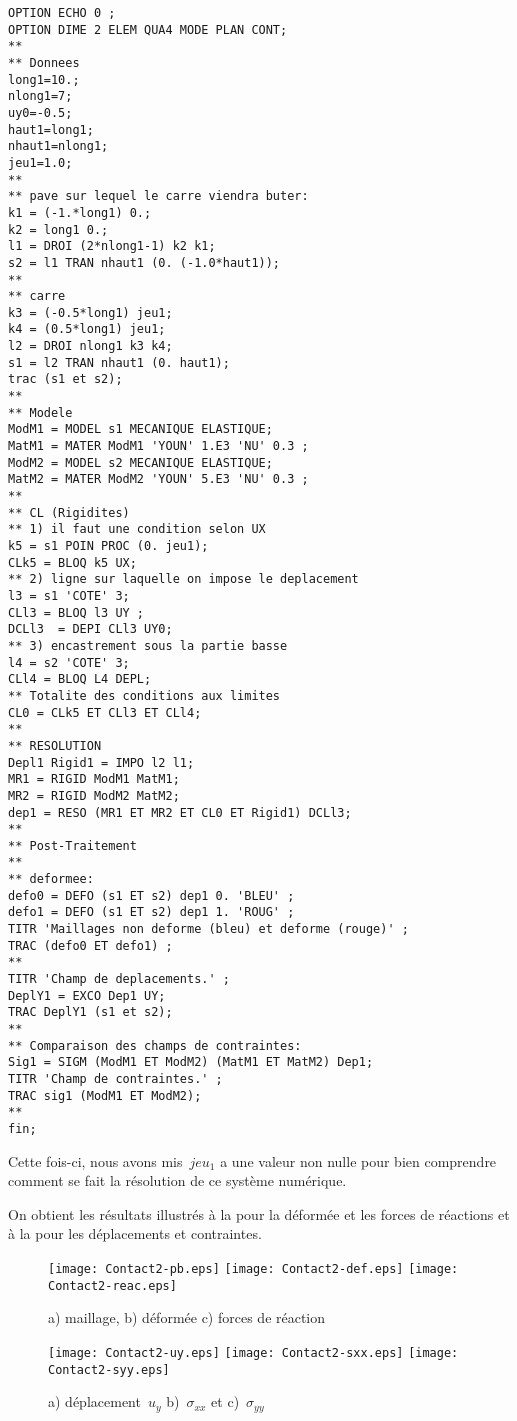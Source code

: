 \begin{multicols}{2}
\begin{lstlisting}[firstnumber=1]
OPTION ECHO 0 ;
OPTION DIME 2 ELEM QUA4 MODE PLAN CONT;
**
** Donnees
long1=10.;
nlong1=7;
uy0=-0.5;
haut1=long1;
nhaut1=nlong1;
jeu1=1.0;
**
** pave sur lequel le carre viendra buter:
k1 = (-1.*long1) 0.;
k2 = long1 0.;
l1 = DROI (2*nlong1-1) k2 k1;
s2 = l1 TRAN nhaut1 (0. (-1.0*haut1));
**
** carre
k3 = (-0.5*long1) jeu1;
k4 = (0.5*long1) jeu1;
l2 = DROI nlong1 k3 k4;
s1 = l2 TRAN nhaut1 (0. haut1);
trac (s1 et s2);
**
** Modele
ModM1 = MODEL s1 MECANIQUE ELASTIQUE;
MatM1 = MATER ModM1 'YOUN' 1.E3 'NU' 0.3 ;
ModM2 = MODEL s2 MECANIQUE ELASTIQUE;
MatM2 = MATER ModM2 'YOUN' 5.E3 'NU' 0.3 ;
**
** CL (Rigidites)
** 1) il faut une condition selon UX
k5 = s1 POIN PROC (0. jeu1);
CLk5 = BLOQ k5 UX;
** 2) ligne sur laquelle on impose le deplacement
l3 = s1 'COTE' 3;
CLl3 = BLOQ l3 UY ;
DCLl3  = DEPI CLl3 UY0;
** 3) encastrement sous la partie basse
l4 = s2 'COTE' 3;
CLl4 = BLOQ L4 DEPL;
** Totalite des conditions aux limites
CL0 = CLk5 ET CLl3 ET CLl4;
**
** RESOLUTION
Depl1 Rigid1 = IMPO l2 l1;
MR1 = RIGID ModM1 MatM1;
MR2 = RIGID ModM2 MatM2;
dep1 = RESO (MR1 ET MR2 ET CL0 ET Rigid1) DCLl3;
**
** Post-Traitement
**
** deformee:
defo0 = DEFO (s1 ET s2) dep1 0. 'BLEU' ;
defo1 = DEFO (s1 ET s2) dep1 1. 'ROUG' ;
TITR 'Maillages non deforme (bleu) et deforme (rouge)' ;
TRAC (defo0 ET defo1) ;
**
TITR 'Champ de deplacements.' ;
DeplY1 = EXCO Dep1 UY;
TRAC DeplY1 (s1 et s2);
**
** Comparaison des champs de contraintes:
Sig1 = SIGM (ModM1 ET ModM2) (MatM1 ET MatM2) Dep1;
TITR 'Champ de contraintes.' ;
TRAC sig1 (ModM1 ET ModM2);
**
fin;
\end{lstlisting}
\end{multicols}

Cette fois-ci, nous avons mis~$jeu_1$ a une valeur non nulle pour bien comprendre comment se fait la résolution de ce système numérique.

On obtient les résultats illustrés à la  pour la déformée et les forces de réactions et à la  pour les déplacements et contraintes.
\begin{figure}[ht]
  \texttt{[image: Contact2-pb.eps]} \hfill 
  \texttt{[image: Contact2-def.eps]}\hfill 
  \texttt{[image: Contact2-reac.eps]}
  \caption{\label{Fig-Cont21} a) maillage, b) déformée c) forces de réaction}
\end{figure}

\begin{figure}[ht]
  \texttt{[image: Contact2-uy.eps]} \hfill 
  \texttt{[image: Contact2-sxx.eps]}\hfill 
  \texttt{[image: Contact2-syy.eps]}
  \caption{\label{Fig-Cont22} a) déplacement~$u_y$ b)~$\sigma_{xx}$ et c)~$\sigma_{yy}$}
\end{figure}









